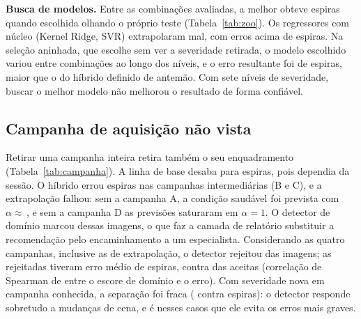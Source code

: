 \documentclass[11pt,a4paper]{article}
\begin{document}
\textbf{Busca de modelos.} Entre as \ZooN{} combinações avaliadas, a melhor obteve \ZooMelhor{} espiras quando escolhida olhando o próprio teste (Tabela~\ref{tab:zoo}). Os regressores com núcleo (Kernel Ridge, SVR) extrapolaram mal, com erros acima de \ZooKernelMin{} espiras. Na seleção aninhada, que escolhe sem ver a severidade retirada, o modelo escolhido variou entre \AninhadaEscolhas{} combinações ao longo dos níveis, e o erro resultante foi de \AninhadaMAE{} espiras, maior que o do híbrido definido de antemão. Com sete níveis de severidade, buscar o melhor modelo não melhorou o resultado de forma confiável.

\begin{table}[t]
\centering
\caption{As seis melhores combinações na severidade não vista (escolhidas olhando o teste, portanto otimistas) e seu erro com campanha não vista}
\label{tab:zoo}
\small
\end{table}

\subsection{Campanha de aquisição não vista}
Retirar uma campanha inteira retira também o seu enquadramento (Tabela~\ref{tab:campanha}). A linha de base desaba para \CampTriv{} espiras, pois dependia da sessão. O híbrido errou \CampHib{} espiras nas campanhas intermediárias (B e C), e a extrapolação falhou: sem a campanha A, a condição saudável foi prevista com $\alpha\approx{}$\,\CampAAlfa, e sem a campanha D as previsões saturaram em $\alpha=1$. O detector de domínio marcou \CampHibOOD{} dessas imagens, o que faz a camada de relatório substituir a recomendação pelo encaminhamento a um especialista. Considerando as quatro campanhas, inclusive as de extrapolação, o detector rejeitou \AbstCampFracRejeitada{} das imagens; as rejeitadas tiveram erro médio de \AbstCampRejeitadas{} espiras, contra \AbstCampAceitas{} das aceitas (correlação de Spearman de \AbstCampRho{} entre o escore de domínio e o erro). Com severidade nova em campanha conhecida, a separação foi fraca (\AbstSevAceitas{} contra \AbstSevRejeitadas{} espiras): o detector responde sobretudo a mudanças de cena, e é nesses casos que ele evita os erros mais graves.

\begin{table}[t]
\centering
\caption{Campanha não vista (erro em espiras) e fração das imagens marcadas como fora do domínio}
\label{tab:campanha}
\small
\end{table}
\end{document}
